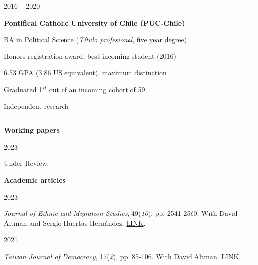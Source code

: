 \documentclass[a4paper, 12pt]{article}
\begin{document}
\begin{multicols}{2}

2016 -- 2020
\columnbreak

\textbf{Pontifical Catholic University of Chile (PUC-Chile)}
\medskip

BA in Political Science (\textit{Título profesional}, five year degree)

Honors registration award, best incoming student (2016)

6.53 GPA (3.86 US equivalent), maximum distinction

Graduated 1$^{st}$ out of an incoming cohort of 59

\end{multicols}




\large Independent research
\smallskip
\hrule
\normalsize

\bigskip
\textbf{Working papers}

\begin{multicols}{2}

2023

\columnbreak

 Under Review.

\end{multicols}



\textbf{Academic articles}

\begin{multicols}{2}

2023

\columnbreak

 \textit{Journal of Ethnic and Migration Studies}, 49(\textit{10}), pp. 2541-2560. With David Altman and Sergio Huertas-Hernández. \href{https://www.tandfonline.com/doi/full/10.1080/1369183X.2023.2182713}{LINK}.

\end{multicols}


\begin{multicols}{2}

2021

\columnbreak

 \textit{Taiwan Journal of Democracy}, 17(\textit{2}), pp. 85-106. With David Altman. \href{https://www.tfd.org.tw/en/publication/journal}{LINK}.

\end{multicols}
\end{document}
